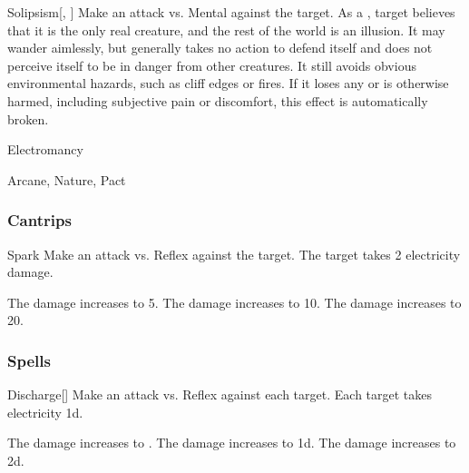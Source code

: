 \lowercase{\hypertarget{spell:Solipsism}{}}\label{spell:Solipsism}
\begin{freeability}[Rank 7]{\hypertarget{spell:Solipsism}{Solipsism}}[, ]
Make an attack vs. Mental against the target.
\hit As a , target believes that it is the only real creature, and the rest of the world is an illusion.
It may wander aimlessly, but generally takes no action to defend itself and does not perceive itself to be in danger from other creatures.
It still avoids obvious environmental hazards, such as cliff edges or fires.
If it loses any  or is otherwise harmed, including subjective pain or discomfort, this effect is automatically broken.

\end{freeability}
\vspace{0.25em}


\newpage
\begin{spellsection}{Electromancy}

\begin{spellheader}
\end{spellheader}


 Arcane, Nature, Pact

\subsubsection{Cantrips}


\begin{freeability}{Spark}
Make an attack vs. Reflex against the target.
\hit The target takes 2 electricity damage.

\rankline
{} The damage increases to 5.
 The damage increases to 10.
 The damage increases to 20.
\end{freeability}

\end{spellsection}


\subsubsection{Spells}


\lowercase{\hypertarget{spell:Discharge}{}}\label{spell:Discharge}
\begin{freeability}[Rank 1]{\hypertarget{spell:Discharge}{Discharge}}[]
Make an attack vs. Reflex against each target.
\hit Each target takes electricity  \minus1d.

\rankline
{} The damage increases to .
 The damage increases to  \plus1d.
 The damage increases to  \plus2d.

\end{freeability}
\vspace{0.25em}



